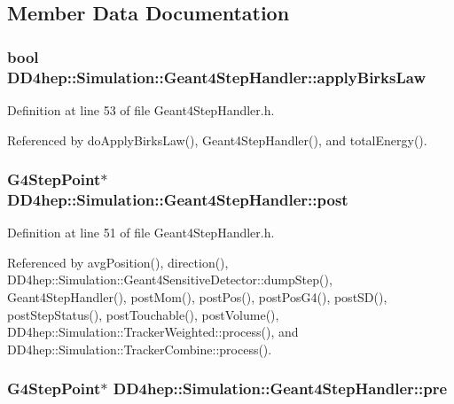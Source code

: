 \subsection{Member Data Documentation}
\hypertarget{class_d_d4hep_1_1_simulation_1_1_geant4_step_handler_ae14ced51d527345a4efed73a39ecd1c0}{
\subsubsection[{applyBirksLaw}]{\setlength{\rightskip}{0pt plus 5cm}bool {\bf DD4hep::Simulation::Geant4StepHandler::applyBirksLaw}}}
\label{class_d_d4hep_1_1_simulation_1_1_geant4_step_handler_ae14ced51d527345a4efed73a39ecd1c0}


Definition at line 53 of file Geant4StepHandler.h.

Referenced by doApplyBirksLaw(), Geant4StepHandler(), and totalEnergy().\hypertarget{class_d_d4hep_1_1_simulation_1_1_geant4_step_handler_aed9081f8334e95c40e321c14621c0a35}{
\subsubsection[{post}]{\setlength{\rightskip}{0pt plus 5cm}G4StepPoint$\ast$ {\bf DD4hep::Simulation::Geant4StepHandler::post}}}
\label{class_d_d4hep_1_1_simulation_1_1_geant4_step_handler_aed9081f8334e95c40e321c14621c0a35}


Definition at line 51 of file Geant4StepHandler.h.

Referenced by avgPosition(), direction(), DD4hep::Simulation::Geant4SensitiveDetector::dumpStep(), Geant4StepHandler(), postMom(), postPos(), postPosG4(), postSD(), postStepStatus(), postTouchable(), postVolume(), DD4hep::Simulation::TrackerWeighted::process(), and DD4hep::Simulation::TrackerCombine::process().\hypertarget{class_d_d4hep_1_1_simulation_1_1_geant4_step_handler_a7c18f2d6e46ecbb380fbe0995029accb}{
\subsubsection[{pre}]{\setlength{\rightskip}{0pt plus 5cm}G4StepPoint$\ast$ {\bf DD4hep::Simulation::Geant4StepHandler::pre}}}
\label{class_d_d4hep_1_1_simulation_1_1_geant4_step_handler_a7c18f2d6e46ecbb380fbe0995029accb}



